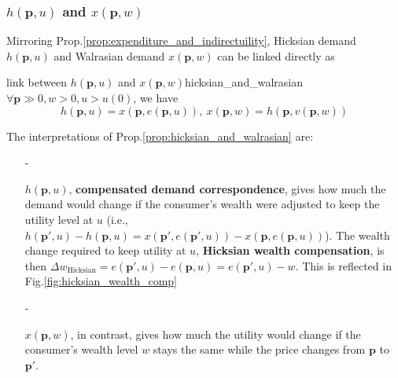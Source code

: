 \subsubsection*{$h(\mathbf{p},u)$ and $x(\mathbf{p},w)$}
Mirroring Prop.\ref{prop:expenditure_and_indirectuility}, Hicksian demand $h(\mathbf{p},u)$ and Walrasian demand $x(\mathbf{p},w)$ can be linked directly as
\begin{proposition}{link between $h(\mathbf{p},u)$ and $x(\mathbf{p},w)$}{hicksian_and_walrasian}
    $\forall \mathbf{p}\gg 0,w>0,u>u(0)$, we have $$h(\mathbf{p},u)=x(\mathbf{p},e(\mathbf{p},u)),\ x(\mathbf{p},w)=h(\mathbf{p},v(\mathbf{p},w))$$
\end{proposition}

The interpretations of Prop.\ref{prop:hicksian_and_walrasian} are:
\begin{enumerate}
    \item[-] 
    
    $h(\mathbf{p},u)$, \textbf{compensated demand correspondence}, gives how much the demand would change if the consumer's wealth were adjusted to keep the utility level at $u$ (i.e., $h(\mathbf{p}',u)-h(\mathbf{p},u)=x(\mathbf{p}',e(\mathbf{p}',u))-x(\mathbf{p},e(\mathbf{p},u))$).
    The wealth change required to keep utility at $u$, \textbf{Hicksian wealth compensation}, is then $\Delta w_{\text{Hicksian}}=e(\mathbf{p}',u)-e(\mathbf{p},u) = e(\mathbf{p}',u)-w$. This is reflected in Fig.\ref{fig:hicksian_wealth_comp}
    \item[-] 
    
    $x(\mathbf{p},w)$, in contrast, gives how much the utility would change if the consumer's wealth level $w$ stays the same while the price changes from $\mathbf{p}$ to $\mathbf{p}'$.
\end{enumerate}

